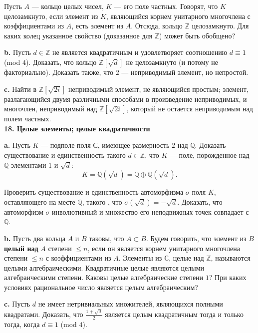 \documentclass{mai_book}
\begin{document}
Пусть $A$ — кольцо целых чисел, $K$ — его поле частных. Говорят, что
$K$ целозамкнуто, если элемент из $K$, являющийся корнем унитарного
многочлена с коэффициентами из $A$, есть элемент из $A$. Отсюда, 
кольцо $\mathbb{Z}$ целозамкнуто. Для каких колец указанное свойство (доказанное для $\mathbb{Z}$) может быть обобщено?

\textbf{b.} Пусть $d \in \mathbb{Z}$ не является квадратичным и удовлетворяет 
соотношению $d \equiv 1$ (mod $4$). Доказать, что кольцо $\mathbb{Z}[\sqrt{d}]$ не целозамкнуто (и потому не факториально). Доказать также, что $2$ — неприводимый элемент, но непростой.

\textbf{c.} Найти в $\mathbb{Z}[\sqrt{2i}]$ неприводимый элемент, не являющийся простым; элемент, разлагающийся двумя различными способами в произведение неприводимых, и многочлен, неприводимый над $\mathbb{Z}[\sqrt{2i}]$, который не остается неприводимым над полем частных.
\\

\noindent \textbf{18. Целые элементы; целые квадратичности}

\textbf{a.} Пусть $K$ — подполе поля $\mathbb{С}$, имеющее размерность $2$ над $\mathbb{Q}$. Доказать существование и единственность такого $d \in \mathbb{Z}$, что $K$ — поле,
порожденное над $\mathbb{Q}$ элементами $1$ и $\sqrt{d}$:
\[
K = \mathbb{Q}(\sqrt{d}) = \mathbb{Q} \oplus \mathbb{Q}(\sqrt{d}).
\]

\noindent Проверить существование и единственность автоморфизма $\sigma$ поля $K$,
оставляющего на месте $\mathbb{Q}$, такого , что $\sigma (\sqrt{d}) = -\sqrt{d}$. Доказать, что автоморфизм $\sigma$ инволютивный и множество его неподвижных точек совпадает с $\mathbb{Q}$.

\textbf{b.} Пусть два кольца $A$ и $B$ таковы, что $A \subset B$. Будем говорить, что элемент из $B$ \textbf{целый над} $A$ степени $\le n$, если он является корнем унитарного многочлена степени $\le n$ с коэффициентами из $A$. Элементы из $\mathbb{C}$, целые над $\mathbb{Z}$, называются целыми алгебраическими. Квадратичные целые являются целыми алгебраическими степени. Каковы целые алгебраические степени $1$? При каких условиях рациональное число является целым алгебраическим?

\textbf{c.} Пусть $d$ не имеет нетривиальных множителей, являющихся полными квадратами. Доказать, что $\frac{1+\sqrt{d}}{2}$ является целым 
квадратичным тогда и только тогда, когда $d \equiv 1$ (mod $4$).
\\
\end{document}
